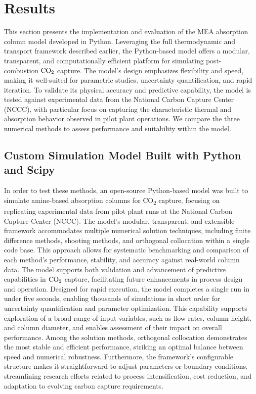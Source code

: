 \documentclass[a4paper,fleqn]{cas-sc}
\newcommand{\COtwo}{{\ce{CO2}}}
\begin{document}
    \section{Results}
    This section presents the implementation and evaluation of the MEA absorption column model developed in Python. Leveraging the full thermodynamic and transport framework described earlier, the Python-based model offers a modular, transparent, and computationally efficient platform for simulating post-combustion $\COtwo$ capture. The model's design emphasizes flexibility and speed, making it well-suited for parametric studies, uncertainty quantification, and rapid iteration. To validate its physical accuracy and predictive capability, the model is tested against experimental data from the National Carbon Capture Center (NCCC), with particular focus on capturing the characteristic thermal and absorption behavior observed in pilot plant operations. We compare the three numerical methods to assess performance and suitability within the model.

    \subsection{Custom Simulation Model Built with Python and Scipy}

    In order to test these methods, an open-source Python-based model was built to simulate amine-based absorption columns for CO\textsubscript{2} capture, focusing on replicating experimental data from pilot plant runs at the National Carbon Capture Center (NCCC). The model’s modular, transparent, and extensible framework accommodates multiple numerical solution techniques, including finite difference methods, shooting methods, and orthogonal collocation within a single code base. This approach allows for systematic benchmarking and comparison of each method’s performance, stability, and accuracy against real-world column data. The model supports both validation and advancement of predictive capabilities in $\COtwo$ capture, facilitating future enhancements in process design and operation. Designed for rapid execution, the model completes a single run in under five seconds, enabling thousands of simulations in short order for uncertainty quantification and parameter optimization. This capability supports exploration of a broad range of input variables, such as flow rates, column height, and column diameter, and enables assessment of their impact on overall performance. Among the solution methods, orthogonal collocation demonstrates the most stable and efficient performance, striking an optimal balance between speed and numerical robustness. Furthermore, the framework’s configurable structure makes it straightforward to adjust parameters or boundary conditions, streamlining research efforts related to process intensification, cost reduction, and adaptation to evolving carbon capture requirements.
\end{document}

